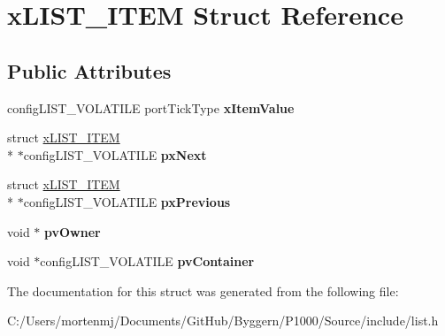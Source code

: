 \hypertarget{structx_l_i_s_t___i_t_e_m}{\section{x\-L\-I\-S\-T\-\_\-\-I\-T\-E\-M Struct Reference}
\label{structx_l_i_s_t___i_t_e_m}
}
\subsection*{Public Attributes}
\begin{DoxyCompactItemize}
\item 
\hypertarget{structx_l_i_s_t___i_t_e_m_acdfef3a9fbae98cef8adc272850ef31c}{config\-L\-I\-S\-T\-\_\-\-V\-O\-L\-A\-T\-I\-L\-E port\-Tick\-Type {\bfseries x\-Item\-Value}}\label{structx_l_i_s_t___i_t_e_m_acdfef3a9fbae98cef8adc272850ef31c}

\item 
\hypertarget{structx_l_i_s_t___i_t_e_m_a03713c4ee953ef5ca6adbec883720c60}{struct \hyperlink{structx_l_i_s_t___i_t_e_m}{x\-L\-I\-S\-T\-\_\-\-I\-T\-E\-M} \\*
$\ast$config\-L\-I\-S\-T\-\_\-\-V\-O\-L\-A\-T\-I\-L\-E {\bfseries px\-Next}}\label{structx_l_i_s_t___i_t_e_m_a03713c4ee953ef5ca6adbec883720c60}

\item 
\hypertarget{structx_l_i_s_t___i_t_e_m_ae8e553eae41010a8e41c66d76c94110b}{struct \hyperlink{structx_l_i_s_t___i_t_e_m}{x\-L\-I\-S\-T\-\_\-\-I\-T\-E\-M} \\*
$\ast$config\-L\-I\-S\-T\-\_\-\-V\-O\-L\-A\-T\-I\-L\-E {\bfseries px\-Previous}}\label{structx_l_i_s_t___i_t_e_m_ae8e553eae41010a8e41c66d76c94110b}

\item 
\hypertarget{structx_l_i_s_t___i_t_e_m_aeb3110b50fe0dbce826d929b27b5ddb1}{void $\ast$ {\bfseries pv\-Owner}}\label{structx_l_i_s_t___i_t_e_m_aeb3110b50fe0dbce826d929b27b5ddb1}

\item 
\hypertarget{structx_l_i_s_t___i_t_e_m_a341462d06236aa07eaf1a864e4b59951}{void $\ast$config\-L\-I\-S\-T\-\_\-\-V\-O\-L\-A\-T\-I\-L\-E {\bfseries pv\-Container}}\label{structx_l_i_s_t___i_t_e_m_a341462d06236aa07eaf1a864e4b59951}

\end{DoxyCompactItemize}


The documentation for this struct was generated from the following file\-:\begin{DoxyCompactItemize}
\item 
C\-:/\-Users/mortenmj/\-Documents/\-Git\-Hub/\-Byggern/\-P1000/\-Source/include/list.\-h\end{DoxyCompactItemize}
